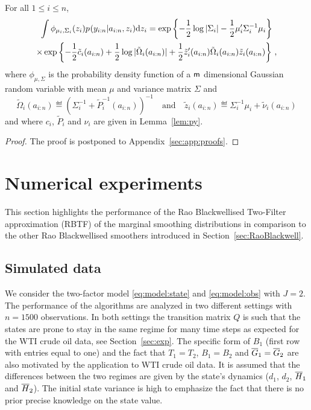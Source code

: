\begin{lemma}
\label{lem:integral:gammap}
For all $1\le i\le n$,
\begin{multline*}
\int \phi_{\mu_i,\Sigma_i}(z_i)p_{}(y_{i:n}|a_{i:n},z_i)\mathrm{d} z_{i} = \exp\left\{-\frac{1}{2}\log |\Sigma_i| - \frac{1}{2}\mu_i'\Sigma^{-1}_i\mu_i\right\}\\
\times\exp\left\{-\frac{1}{2}\tilde{c}_{i}(a_{i:n})+\frac{1}{2}\log|\tilde{\Omega}_{i}(a_{i:n})| +\frac{1}{2}\tilde{z}'_i(a_{i:n})\tilde{\Omega}_{i}(a_{i:n})\tilde{z}_i(a_{i:n})\right\}\,,
\end{multline*}
where $\phi_{\mu,\Sigma}$ is the probability density function of a $\mathsf{m}$ dimensional Gaussian random variable with mean $\mu$ and variance matrix $\Sigma$ and
\[
\tilde{\Omega}_{i}(a_{i:n})\eqdef \left(\Sigma_i^{-1} + \tilde{P}_{i}^{-1}(a_{i:n})\right)^{-1}\quad\mbox{and}\quad
\tilde{z}_i(a_{i:n})\eqdef \Sigma_i^{-1}\mu_i+\tilde{\nu}_{i}(a_{i:n})
\]
and where $c_{i}$, $\tilde{P}_{i}$ and $\nu_{i}$ are given in Lemma~\ref{lem:py}.
\end{lemma}
\begin{proof}
The proof is postponed to Appendix~\ref{sec:app:proofs}.
\end{proof}


\section{Numerical experiments}
\label{sec:numerical:experiments}
This section highlights the performance of the Rao Blackwellised Two-Filter approximation (RBTF) of the marginal smoothing distributions in comparison to the other Rao Blackwellised smoothers introduced in Section~\ref{sec:RaoBlackwell}.  

\subsection{Simulated data}
We consider the two-factor model \eqref{eq:model:state} and \eqref{eq:model:obs} with $J=2$. The performance of the algorithms are analyzed in two different settings with $n=1500$ observations. In both settings the transition matrix $Q$ is such that the states are prone to stay in the same regime  for many time steps as expected for the WTI crude oil data,  see Section~\ref{sec:exp}. The specific form of $B_1$ (first row with entries equal to one) and the fact that $T_1 = T_2$, $B_1 = B_2 $ and $\overline{G}_1 = \overline{G}_2$ are also motivated by the application to WTI crude oil data.  It is assumed that the differences between the two regimes are given by the state's dynamics ($d_1$, $d_2$, $\overline{H}_1$ and $\overline{H}_2$). The initial state variance is high to emphasize the fact that there is no prior precise knowledge on the state value.


